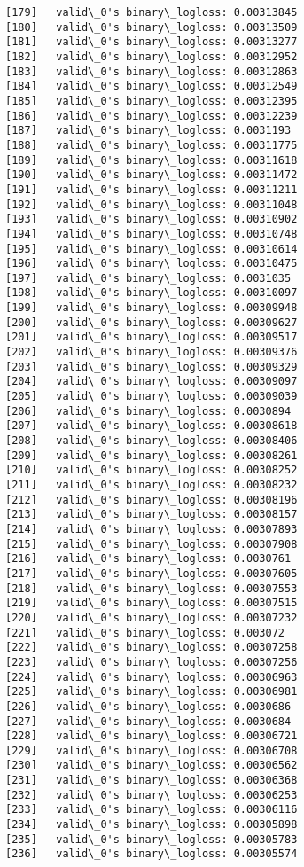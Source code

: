 \documentclass[11pt]{article}
\begin{document}
\begin{Verbatim}[commandchars=\\\{\}]
[179]	valid\_0's binary\_logloss: 0.00313845
[180]	valid\_0's binary\_logloss: 0.00313509
[181]	valid\_0's binary\_logloss: 0.00313277
[182]	valid\_0's binary\_logloss: 0.00312952
[183]	valid\_0's binary\_logloss: 0.00312863
[184]	valid\_0's binary\_logloss: 0.00312549
[185]	valid\_0's binary\_logloss: 0.00312395
[186]	valid\_0's binary\_logloss: 0.00312239
[187]	valid\_0's binary\_logloss: 0.0031193
[188]	valid\_0's binary\_logloss: 0.00311775
[189]	valid\_0's binary\_logloss: 0.00311618
[190]	valid\_0's binary\_logloss: 0.00311472
[191]	valid\_0's binary\_logloss: 0.00311211
[192]	valid\_0's binary\_logloss: 0.00311048
[193]	valid\_0's binary\_logloss: 0.00310902
[194]	valid\_0's binary\_logloss: 0.00310748
[195]	valid\_0's binary\_logloss: 0.00310614
[196]	valid\_0's binary\_logloss: 0.00310475
[197]	valid\_0's binary\_logloss: 0.0031035
[198]	valid\_0's binary\_logloss: 0.00310097
[199]	valid\_0's binary\_logloss: 0.00309948
[200]	valid\_0's binary\_logloss: 0.00309627
[201]	valid\_0's binary\_logloss: 0.00309517
[202]	valid\_0's binary\_logloss: 0.00309376
[203]	valid\_0's binary\_logloss: 0.00309329
[204]	valid\_0's binary\_logloss: 0.00309097
[205]	valid\_0's binary\_logloss: 0.00309039
[206]	valid\_0's binary\_logloss: 0.0030894
[207]	valid\_0's binary\_logloss: 0.00308618
[208]	valid\_0's binary\_logloss: 0.00308406
[209]	valid\_0's binary\_logloss: 0.00308261
[210]	valid\_0's binary\_logloss: 0.00308252
[211]	valid\_0's binary\_logloss: 0.00308232
[212]	valid\_0's binary\_logloss: 0.00308196
[213]	valid\_0's binary\_logloss: 0.00308157
[214]	valid\_0's binary\_logloss: 0.00307893
[215]	valid\_0's binary\_logloss: 0.00307908
[216]	valid\_0's binary\_logloss: 0.0030761
[217]	valid\_0's binary\_logloss: 0.00307605
[218]	valid\_0's binary\_logloss: 0.00307553
[219]	valid\_0's binary\_logloss: 0.00307515
[220]	valid\_0's binary\_logloss: 0.00307232
[221]	valid\_0's binary\_logloss: 0.003072
[222]	valid\_0's binary\_logloss: 0.00307258
[223]	valid\_0's binary\_logloss: 0.00307256
[224]	valid\_0's binary\_logloss: 0.00306963
[225]	valid\_0's binary\_logloss: 0.00306981
[226]	valid\_0's binary\_logloss: 0.0030686
[227]	valid\_0's binary\_logloss: 0.0030684
[228]	valid\_0's binary\_logloss: 0.00306721
[229]	valid\_0's binary\_logloss: 0.00306708
[230]	valid\_0's binary\_logloss: 0.00306562
[231]	valid\_0's binary\_logloss: 0.00306368
[232]	valid\_0's binary\_logloss: 0.00306253
[233]	valid\_0's binary\_logloss: 0.00306116
[234]	valid\_0's binary\_logloss: 0.00305898
[235]	valid\_0's binary\_logloss: 0.00305783
[236]	valid\_0's binary\_logloss: 0.00305574

\end{Verbatim}
\end{document}
